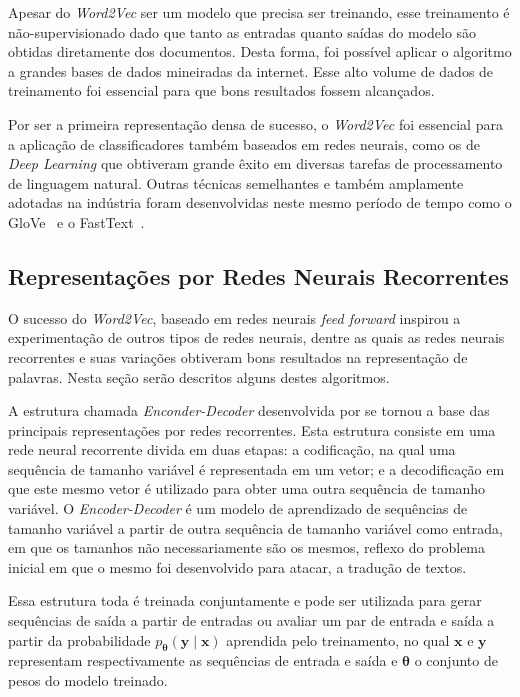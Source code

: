 
Apesar do \textit{Word2Vec} ser um modelo que precisa ser treinando, esse
treinamento é não-supervisionado dado que tanto as entradas quanto saídas do
modelo são obtidas diretamente dos documentos.
Desta forma, foi possível aplicar o algoritmo a grandes bases de dados
mineiradas da internet.
Esse alto volume de dados de treinamento foi essencial para que bons resultados
fossem alcançados.

Por ser a primeira representação densa de sucesso, o \textit{Word2Vec} foi
essencial para a aplicação de classificadores também baseados em redes neurais,
como os de \textit{Deep Learning} que obtiveram grande êxito em diversas
tarefas de processamento de linguagem natural.
Outras técnicas semelhantes e também amplamente adotadas na indústria foram
desenvolvidas neste mesmo período de tempo como o GloVe~\cite{pennington14} e
o FastText~\cite{bojanowski17}.


\subsection{Representações por Redes Neurais Recorrentes}
\label{representation:rnn}

O sucesso do \textit{Word2Vec}, baseado em redes neurais \textit{feed forward}
inspirou a experimentação de outros tipos de redes neurais, dentre as quais as
redes neurais recorrentes e suas variações obtiveram bons resultados na
representação de palavras.
Nesta seção serão descritos alguns destes algoritmos.

A estrutura chamada \textit{Enconder-Decoder} desenvolvida por \citet{cho14} se
tornou a base das principais representações por redes recorrentes.
Esta estrutura consiste em uma rede neural recorrente divida em duas etapas: a
codificação, na qual uma sequência de tamanho variável é representada em um
vetor; e a decodificação em que este mesmo vetor é utilizado para obter uma
outra sequência de tamanho variável.
O \textit{Encoder-Decoder} é um modelo de aprendizado de sequências de tamanho
variável a partir de outra sequência de tamanho variável como entrada, em que
os tamanhos não necessariamente são os mesmos, reflexo do problema inicial em
que o mesmo foi desenvolvido para atacar, a tradução de textos.


Essa estrutura toda é treinada conjuntamente e pode ser utilizada para gerar
sequências de saída a partir de entradas ou avaliar um par de entrada e saída a
partir da probabilidade $p_{\mathbf{\theta}}(\mathbf{y} \mid \mathbf{x})$
aprendida pelo treinamento, no qual $\mathbf{x}$ e $\mathbf{y}$ representam
respectivamente as sequências de entrada e saída e $\mathbf{\theta}$ o conjunto
de pesos do modelo treinado.

